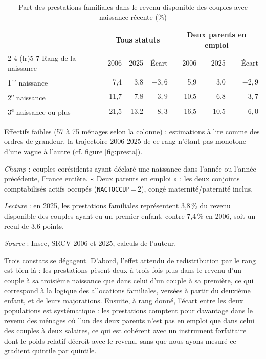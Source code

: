 \documentclass[12pt,a4paper]{article}
\begin{document}
\bigskip

\begin{table}[htbp]
	\centering
	\footnotesize
	\setlength{\tabcolsep}{5pt}
	\begin{threeparttable}
		\caption{Part des prestations familiales dans le revenu disponible des couples avec naissance récente (\%)}
		\label{tab:presta}
		\begin{tabular}{lrrrrrr}
			\toprule
			& \multicolumn{3}{c}{Tous statuts} & \multicolumn{3}{c}{Deux parents en emploi} \\
			\cmidrule(lr){2-4} \cmidrule(lr){5-7}
			Rang de la naissance & 2006 & 2025 & Écart & 2006 & 2025 & Écart \\
			\midrule
			1\textsuperscript{re} naissance & 7,4 & 3,8 & $-3{,}6$ & 5,9 & 3,0 & $-2{,}9$ \\
			2\textsuperscript{e} naissance   & 11,7 & 7,8 & $-3{,}9$ & 10,5 & 6,8 & $-3{,}7$ \\
			3\textsuperscript{e} naissance ou plus\tnote{a} & 21,5 & 13,2 & $-8{,}3$ & 16,5 & 10,5 & $-6{,}0$ \\
			\bottomrule
		\end{tabular}
		\begin{tablenotes}[flushleft]\scriptsize
			\item[a] Effectifs faibles (57 à 75 ménages selon la colonne) : estimations à lire comme des ordres de grandeur, la trajectoire 2006-2025 de ce rang n'étant pas monotone d'une vague à l'autre (cf. figure \ref{fig:presta}).
			\item \textit{Champ} : couples corésidents ayant déclaré une naissance dans l'année ou l'année
			précédente, France entière. « Deux parents en emploi » : les deux conjoints comptabilisés
			actifs occupés (\texttt{NACTOCCUP}\,=\,2), congé maternité/paternité inclus.
			\item \textit{Lecture} : en 2025, les prestations familiales représentent 3,8\,\% du revenu
			disponible des couples ayant eu un premier enfant, contre 7,4\,\% en 2006, soit un recul de
			3,6 points.
			\item \textit{Source} : Insee, SRCV 2006 et 2025, calculs de l'auteur.
		\end{tablenotes}
	\end{threeparttable}
\end{table}

\bigskip

\noindent Trois constats se dégagent. D'abord, l'effet attendu de redistribution par le rang est bien là : les prestations pèsent deux à trois fois plus dans le revenu d'un couple à sa troisième naissance que dans celui d'un couple à sa première, ce qui correspond à la logique des allocations familiales, versées à partir du deuxième enfant, et de leurs majorations. Ensuite, à rang donné, l'écart entre les deux populations est systématique : les prestations comptent pour davantage dans le revenu des ménages où l'un des deux parents n'est pas en emploi que dans celui des couples à deux salaires, ce qui est cohérent avec un instrument forfaitaire dont le poids relatif décroît avec le revenu, sans que nous ayons mesuré ce gradient quintile par quintile. \\
\end{document}
